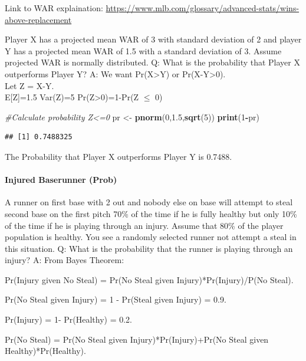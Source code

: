 \documentclass[]{article}
\newenvironment{Shaded}{\begin{snugshade}}{\end{snugshade}}
\newcommand{\CommentTok}[1]{\textcolor[rgb]{0.56,0.35,0.01}{\textit{#1}}}
\newcommand{\DecValTok}[1]{\textcolor[rgb]{0.00,0.00,0.81}{#1}}
\newcommand{\FloatTok}[1]{\textcolor[rgb]{0.00,0.00,0.81}{#1}}
\newcommand{\KeywordTok}[1]{\textcolor[rgb]{0.13,0.29,0.53}{\textbf{#1}}}
\newcommand{\NormalTok}[1]{#1}
\newcommand{\OperatorTok}[1]{\textcolor[rgb]{0.81,0.36,0.00}{\textbf{#1}}}
\newcommand{\StringTok}[1]{\textcolor[rgb]{0.31,0.60,0.02}{#1}}
\let\oldparagraph\paragraph
\renewcommand{\paragraph}[1]{\oldparagraph{#1}\mbox{}}
\begin{document}
Link to WAR explaination:
\url{https://www.mlb.com/glossary/advanced-stats/wins-above-replacement}

Player X has a projected mean WAR of 3 with standard deviation of 2 and
player Y has a projected mean WAR of 1.5 with a standard deviation of 3.
Assume projected WAR is normally distributed. Q: What is the probability
that Player X outperforms Player Y? A: We want Pr(X\textgreater{}Y) or
Pr(X-Y\textgreater{}0).\\
Let Z = X-Y.\\
E{[}Z{]}=1.5 Var(Z)=5 Pr(Z\textgreater{}0)=1-Pr(Z \(\leq\) 0)

\begin{Shaded}
\begin{Highlighting}[]
\CommentTok{#Calculate probability Z<=0}
\NormalTok{pr <-}\StringTok{ }\KeywordTok{pnorm}\NormalTok{(}\DecValTok{0}\NormalTok{,}\FloatTok{1.5}\NormalTok{,}\KeywordTok{sqrt}\NormalTok{(}\DecValTok{5}\NormalTok{))}
\KeywordTok{print}\NormalTok{(}\DecValTok{1}\OperatorTok{-}\NormalTok{pr)}
\end{Highlighting}
\end{Shaded}

\begin{verbatim}
## [1] 0.7488325
\end{verbatim}

The Probability that Player X outperforms Player Y is 0.7488.

\hypertarget{injured-baserunner-prob}{%
\paragraph{Injured Baserunner (Prob)}\label{injured-baserunner-prob}}

A runner on first base with 2 out and nobody else on base will attempt
to steal second base on the first pitch 70\% of the time if he is fully
healthy but only 10\% of the time if he is playing through an injury.
Assume that 80\% of the player population is healthy. You see a randomly
selected runner not attempt a steal in this situation. Q: What is the
probability that the runner is playing through an injury? A: From Bayes
Theorem:

Pr(Injury given No Steal) = Pr(No Steal given Injury)*Pr(Injury)/P(No
Steal).

Pr(No Steal given Injury) = 1 - Pr(Steal given Injury) = 0.9.

Pr(Injury) = 1- Pr(Healthy) = 0.2.

Pr(No Steal) = Pr(No Steal given Injury)*Pr(Injury)+Pr(No Steal given
Healthy)*Pr(Healthy).
\end{document}
